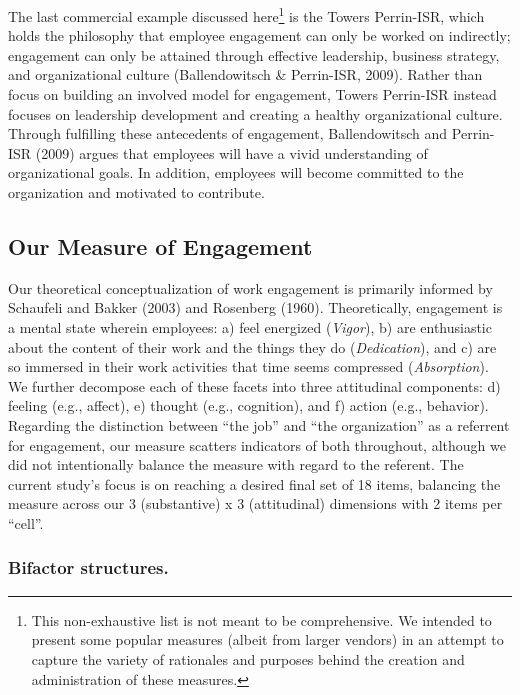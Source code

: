 \documentclass[
  man]{apa6}
\begin{document}
The last commercial example discussed here\footnote{This non-exhaustive list is not meant to be comprehensive. We intended to present some popular measures (albeit from larger vendors) in an attempt to capture the variety of rationales and purposes behind the creation and administration of these measures.} is the Towers Perrin-ISR, which holds the philosophy that employee engagement can only be worked on indirectly; engagement can only be attained through effective leadership, business strategy, and organizational culture (Ballendowitsch \& Perrin-ISR, 2009). Rather than focus on building an involved model for engagement, Towers Perrin-ISR instead focuses on leadership development and creating a healthy organizational culture. Through fulfilling these antecedents of engagement, Ballendowitsch and Perrin-ISR (2009) argues that employees will have a vivid understanding of organizational goals. In addition, employees will become committed to the organization and motivated to contribute.

\hypertarget{our-measure-of-engagement}{%
\subsection{Our Measure of Engagement}\label{our-measure-of-engagement}}

Our theoretical conceptualization of work engagement is primarily informed by Schaufeli and Bakker (2003) and Rosenberg (1960). Theoretically, engagement is a mental state wherein employees: a) feel energized (\emph{Vigor}), b) are enthusiastic about the content of their work and the things they do (\emph{Dedication}), and c) are so immersed in their work activities that time seems compressed (\emph{Absorption}). We further decompose each of these facets into three attitudinal components: d) feeling (e.g., affect), e) thought (e.g., cognition), and f) action (e.g., behavior). Regarding the distinction between ``the job'' and ``the organization'' as a referrent for engagement, our measure scatters indicators of both throughout, although we did not intentionally balance the measure with regard to the referent. The current study's focus is on reaching a desired final set of 18 items, balancing the measure across our 3 (substantive) x 3 (attitudinal) dimensions with 2 items per ``cell''.

\hypertarget{bifactor-structures.}{%
\subsubsection{Bifactor structures.}\label{bifactor-structures.}}
\end{document}
